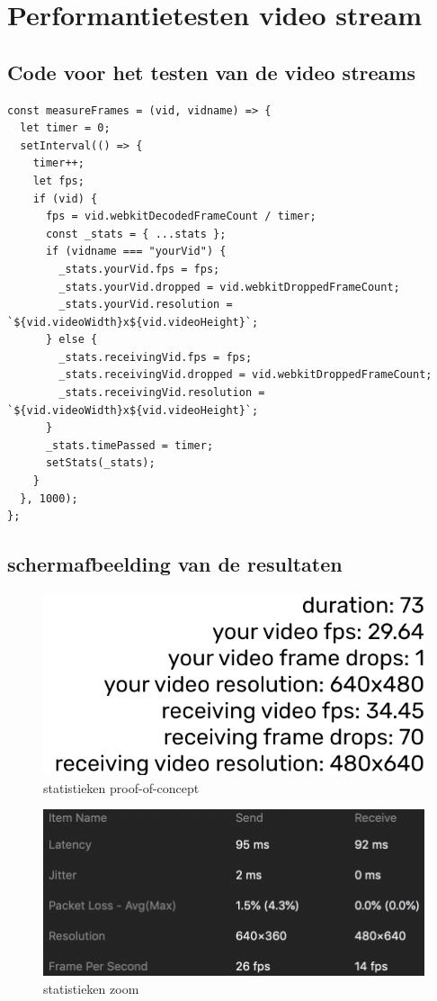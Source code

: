 
\chapter{Performantietesten video stream}

\section{Code voor het testen van de video streams}

\begin{lstlisting}
const measureFrames = (vid, vidname) => {
  let timer = 0;
  setInterval(() => {
    timer++;
    let fps;
    if (vid) {
      fps = vid.webkitDecodedFrameCount / timer;
      const _stats = { ...stats };
      if (vidname === "yourVid") {
        _stats.yourVid.fps = fps;
        _stats.yourVid.dropped = vid.webkitDroppedFrameCount;
        _stats.yourVid.resolution = `${vid.videoWidth}x${vid.videoHeight}`;
      } else {
        _stats.receivingVid.fps = fps;
        _stats.receivingVid.dropped = vid.webkitDroppedFrameCount;
        _stats.receivingVid.resolution = `${vid.videoWidth}x${vid.videoHeight}`;
      }
      _stats.timePassed = timer;
      setStats(_stats);
    }
  }, 1000);
};
\end{lstlisting}

\section{schermafbeelding van de resultaten}
\begin{figure}[H]
	\centering
	\includegraphics[width=120mm]{./img/statsPWA}		
	\caption{statistieken proof-of-concept}
\end{figure}

\begin{figure}[H]
	\centering
	\includegraphics[width=120mm]{./img/statsZoom}		
	\caption{statistieken zoom}
\end{figure}